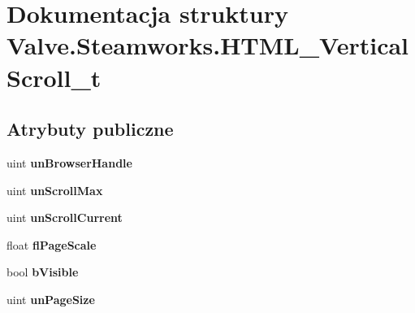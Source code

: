 \hypertarget{struct_valve_1_1_steamworks_1_1_h_t_m_l___vertical_scroll__t}{}\section{Dokumentacja struktury Valve.\+Steamworks.\+H\+T\+M\+L\+\_\+\+Vertical\+Scroll\+\_\+t}
\label{struct_valve_1_1_steamworks_1_1_h_t_m_l___vertical_scroll__t}
\subsection*{Atrybuty publiczne}
\begin{DoxyCompactItemize}
\item 
\mbox{\label{struct_valve_1_1_steamworks_1_1_h_t_m_l___vertical_scroll__t_a2059ff9cb7f6ffe613149552806ec5af}} 
uint {\bfseries un\+Browser\+Handle}
\item 
\mbox{\label{struct_valve_1_1_steamworks_1_1_h_t_m_l___vertical_scroll__t_ad411f14f9c5e38c4db2ef9e7eee849af}} 
uint {\bfseries un\+Scroll\+Max}
\item 
\mbox{\label{struct_valve_1_1_steamworks_1_1_h_t_m_l___vertical_scroll__t_ac013b093c5ea532ed609eac81078ddad}} 
uint {\bfseries un\+Scroll\+Current}
\item 
\mbox{\label{struct_valve_1_1_steamworks_1_1_h_t_m_l___vertical_scroll__t_afd4f9716097c4c155e795834a42ceb26}} 
float {\bfseries fl\+Page\+Scale}
\item 
\mbox{\label{struct_valve_1_1_steamworks_1_1_h_t_m_l___vertical_scroll__t_af9171920732de51cdaa9b472d1e4fe32}} 
bool {\bfseries b\+Visible}
\item 
\mbox{\label{struct_valve_1_1_steamworks_1_1_h_t_m_l___vertical_scroll__t_adeecb2fed5dcb9018f9f4cf862f32233}} 
uint {\bfseries un\+Page\+Size}
\end{DoxyCompactItemize}


